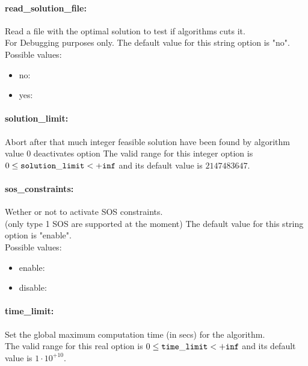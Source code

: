 \paragraph{read\_solution\_file:}\label{sec:read_solution_file} Read a file with the optimal solution to test if algorithms cuts it. $\;$ \\
 For Debugging purposes only.
The default value for this string option is "no".
\\ 
Possible values:
\begin{itemize}
   \item no: 
   \item yes: 
\end{itemize}

\paragraph{solution\_limit:}\label{sec:solution_limit} Abort after that much integer feasible solution have been found by algorithm $\;$ \\
 value 0 deactivates option The valid range for this integer option is
$0 \le {\tt solution\_limit } <  {\tt +inf}$
and its default value is $2147483647$.


\paragraph{sos\_constraints:}\label{sec:sos_constraints} Wether or not to activate SOS constraints. $\;$ \\
 (only type 1 SOS are supported at the moment)
The default value for this string option is "enable".
\\ 
Possible values:
\begin{itemize}
   \item enable: 
   \item disable: 
\end{itemize}

\paragraph{time\_limit:}\label{sec:time_limit} Set the global maximum computation time (in secs) for the algorithm. $\;$ \\
 The valid range for this real option is 
$0 \le {\tt time\_limit } <  {\tt +inf}$
and its default value is $1 \cdot 10^{+10}$.


